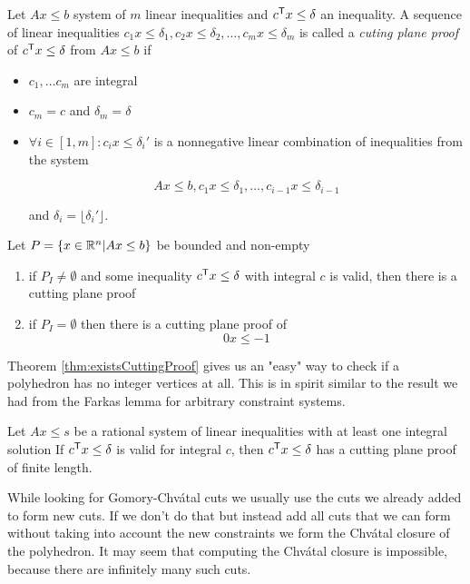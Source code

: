 \begin{Def} Let $Ax\leq b$ system of $m$ linear inequalities and ${c}^\text{\upshape \sffamily T}x\leq \delta$ an inequality. A sequence of linear inequalities $c_1x\leq \delta_1, c_2x\leq \delta_2,\ldots, c_mx\leq \delta_m$ is called a \emph{cuting plane proof} of ${c}^\text{\upshape \sffamily T} x\leq \delta$ from $Ax\leq b$ if
\begin{itemize}
\item $c_1,\ldots c_m$ are integral
\item $c_m=c$ and $\delta_m=\delta$
\item $\forall i\in [1,m]: c_ix\leq \delta_i'$ is a nonnegative linear combination of inequalities from the system

\[Ax\leq b, c_1x\leq \delta_1,\ldots,c_{i-1}x\leq \delta_{i-1}\]

and $\delta_i=\lfloor \delta_i'\rfloor$.
\end{itemize}
\end{Def}

\begin{thm}[Existence]\label{thm:existsCuttingProof} Let $P=\{x\in \mathbb{R}^n | Ax\leq b\}$ be bounded and non-empty

\begin{enumerate}
\item if $P_I\neq \emptyset$ and some inequality ${c}^\text{\upshape \sffamily T} x\leq \delta$ with integral $c$ is valid, then there is a cutting plane proof
\item if $P_I=\emptyset$ then there is a cutting plane proof of 
\[0x\leq -1\]
\end{enumerate}
\end{thm}

Theorem \ref{thm:existsCuttingProof} gives us an "easy" way to check if a polyhedron has no integer vertices at all. This is in spirit similar to the result we had from the Farkas lemma for arbitrary constraint systems.

\begin{thm} Let $Ax\leq s$ be a rational system of linear inequalities with at least one integral solution If ${c}^\text{\upshape \sffamily T}x\leq \delta$ is valid for integral $c$, then ${c}^\text{\upshape \sffamily T}x\leq \delta$ has a cutting plane proof of finite length.
\end{thm}

While looking for Gomory-Chv\'{a}tal cuts we usually use the cuts we already added to form new cuts. If we don't do that but instead add all cuts that we can form without taking into account the new constraints we form the Chv\'{a}tal closure of the polyhedron. It may seem that computing the Chv\'atal closure is impossible, because there are infinitely many such cuts.

